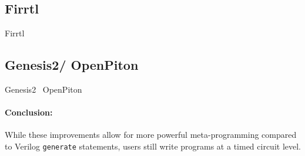 \subsection{Firrtl}
Firrtl~\cite{izraelevitz_2017_firrtl_reusability, li_2016_firrtl_specification}

\subsection{Genesis2/ OpenPiton}
Genesis2~\cite{genesis2}
%
OpenPiton~\cite{balkind_asplos_2016_openpiton}

\paragraph{Conclusion: } While these improvements allow for more powerful meta-programming compared to Verilog \texttt{\small{generate}} statements, users still write programs at a timed circuit level.

